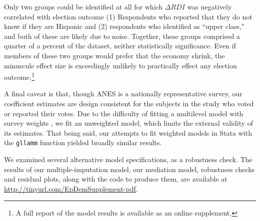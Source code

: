 \documentclass[11pt]{article}
\begin{document}
Only two groups could be identified at all for which $\Delta RDI$ was negatively correlated with election outcome (1) Respondents who reported that they do not know if they are Hispanic and (2) respondents who identified as ``upper class," and both of these are likely due to noise. Together, these groups comprised a quarter of a percent of the dataset, neither statistically significance.
Even if members of these two groups would prefer that the economy shrink, the minuscule effect size is exceedingly unlikely to practically effect any election outcome.\footnote{A full report of the model results is available as an online supplement.}

\begin{comment}
Though we argue that RDI's lack of significance when prospective and retrospective variables are included in the model is not a problem, we must admit that this informal path analysis \citep{baron1986moderator} should be taken with a grain of salt.
In particular; \citet{imai2010identification} has shown that the path analysis estimators of indirect and direct effects rely upon sequential ignorability.
Among other things, this implies that, conditioning on the other variables in the model, the relationship between subjects' perceptions of the economy and their votes are unconfounded.
This would be violated if, say, a different macroeconomic indicator, such as unemployment, predicted both subjects' perceptions of the economy and RDI.
Nevertheless, it is hard to see how RDI would affect voters' choices other than by affecting their perceptions of the macroeconomy, and these results support that intuition.
\end{comment}

A final caveat is that, though ANES is a nationally representative survey, our coefficient estimates are design consistent for the subjects in the study who voted or reported their votes.
Due to the difficulty of fitting a multilevel model with survey weights \citep{gelman2007struggles}, we fit an unweighted model, which limits the external validity of its estimates.
That being said, our attempts to fit weighted models in Stata \citep{stata} with the \verb|gllamm| function \citep{gllamm} yielded broadly similar results.

We examined several alternative model specifications, as a robustness check.
The results of %
our multiple-imputation model, our mediation model, robustness checks and residual plots, along with the code to produce them, are available at \url{http://tinyurl.com/EpDemSupplement-pdf}.
\end{document}

